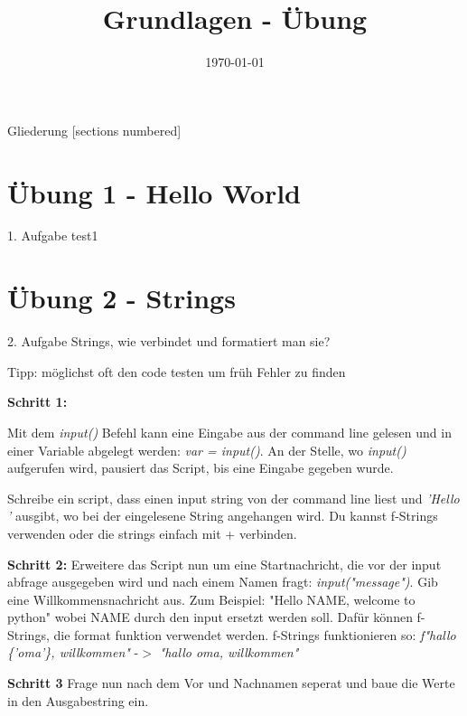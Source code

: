 



\title{Grundlagen - Übung}
\date{\today}




\maketitle

\begin{frame}{Gliederung}
	[sections numbered]
	\tableofcontents
\end{frame}


\section{Übung 1 - Hello World}

\begin{frame}{1. Aufgabe}
	test1
\end{frame}

\section{Übung 2 - Strings}

\begin{frame}{2. Aufgabe}
	Strings, wie verbindet und formatiert man sie?
	
	Tipp: möglichst oft den code testen um früh Fehler zu finden
	
	\textbf{Schritt 1:}
	
	Mit dem \textit{input()} Befehl kann eine Eingabe aus der command line gelesen und in einer Variable abgelegt werden: \textit{var = input()}. An der Stelle, wo \textit{input()} aufgerufen wird, pausiert das Script, bis eine Eingabe gegeben wurde.
	
	Schreibe ein script, dass einen input string von der command line liest und \textit{'Hello '} ausgibt, wo bei der eingelesene String angehangen wird. Du kannst f-Strings verwenden oder die strings einfach mit + verbinden.
\end{frame}
\begin{frame}
	\textbf{Schritt 2:}
	Erweitere das Script nun um eine Startnachricht, die vor der input abfrage ausgegeben wird und nach einem Namen fragt: \textit{input("message")}. Gib eine Willkommensnachricht aus. Zum Beispiel: "Hello NAME, welcome to python" wobei NAME durch den input ersetzt werden soll. Dafür können f-Strings, die format funktion verwendet werden.
	\linebreak
	f-Strings funktionieren so: \textit{f"hallo \{'oma'\}, willkommen"} -$>$ \textit{"hallo oma, willkommen"}
	\linebreak
	
	\textbf{Schritt 3}	
	Frage nun nach dem Vor und Nachnamen seperat und baue die Werte in den Ausgabestring ein.
\end{frame}


